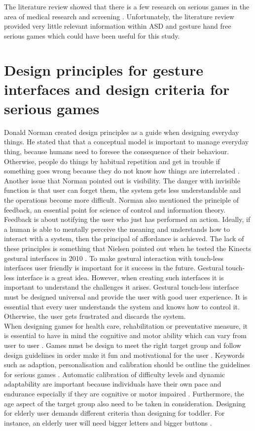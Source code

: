 The literature review showed that there is a few research on serious games in the area of medical research and screening \cite{Tong2016, Ben-Sadoun2018}. Unfortunately, the literature review provided very little relevant information within ASD and gesture hand free serious games which could have been useful for this study.



\section{Design principles for gesture interfaces and design criteria for serious games}
\label{sec:designprinciples}
Donald Norman created design principles as a guide when designing everyday things. He stated that that a conceptual model is important to manage everyday thing, because humans need to foresee the consequence of their behaviour. Otherwise, people do things by habitual repetition and get in trouble if something goes wrong because they do not know how things are interrelated \cite{Norman2002}. Another issue that Norman pointed out is visibility. The danger with invisible function is that user can forget them, the system gets less understandable and the operations become more difficult. Norman also mentioned the principle of feedback, an essential point for science of control and information theory. Feedback is about notifying the user who just has performed an action. Ideally, if a human is able to mentally perceive the meaning and understands how to interact with a system, then the principal of affordance is achieved. The lack of these principles is something that Nielsen pointed out when he tested the Kinects gestural interfaces in 2010 \cite{Nielsen2010}. To make gestural interaction with touch-less interfaces user friendly is important for it success in the future. 
Gestural touch-less interface is a great idea. However, when creating such interfaces it is important to understand the challenges it arises. Gestural touch-less interface must be designed universal and provide the user with good user experience. It is essential that every user understands the system and knows how to control it. Otherwise, the user gets frustrated and discards the system. 
\\
When designing games for health care, rehabilitation or preventative measure, it is essential to have in mind the cognitive and motor ability which can vary from user to user \cite{Mendes2012}. Games must be design to meet the right target group and follow design guidelines in order make it fun and motivational for the user \cite{Mendes2012}. Keywords such as adaption, personalisation and calibration should be outline the guidelines for serious games \cite{Goebel2010}. Automatic calibration of difficulty levels and dynamic adaptability are important because individuals have their own pace and endurance especially if they are cognitive or motor impaired \cite{Geurts2011, Bouchard}. Furthermore, the age aspect of the target group also need to be taken in consideration. Designing for elderly user demands different criteria than designing for toddler. For instance, an elderly user will need bigger letters and bigger buttons \cite{Palacio2012}. 

